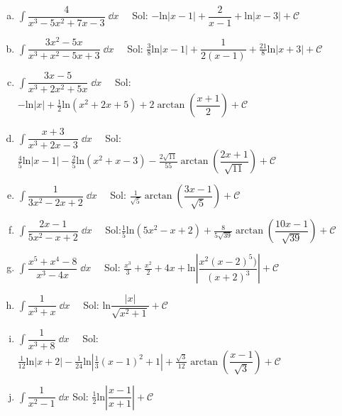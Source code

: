 {\begin{enumerate}[a) ]
\item $\displaystyle \int  \dfrac {4}{x^3-5x^2+7x-3} \; \dd x \quad $
\textcolor{gris}{Sol: $-\mathrm{ln}|x-1|+\dfrac {2}{x-1}+\mathrm{ln}|x-3|   +\mathcal C$}

\item $\displaystyle \int  \dfrac {3x^2-5x}{x^3+x^2-5x+3} \; \dd x \quad $
\textcolor{gris}{Sol: $\frac 3 8 \mathrm{ln} |x-1|+ \dfrac {1}{2(x-1)}+ \frac {21}{8} \mathrm{ln} |x+3|   +\mathcal C$}

\item $\displaystyle \int  \dfrac {3x-5}{x^3+2x^2+5x} \; \dd x \quad $
\textcolor{gris}{Sol: $ -\mathrm{ln}|x| + \frac 1 2 \mathrm{ln} (x^2+2x+5) + 2 \arctan \left( \dfrac {x+1}{2}  \right)  +\mathcal C$}

\item $\displaystyle \int  \dfrac {x+3}{x^3+2x-3} \; \dd x \quad $
\textcolor{gris}{Sol: $ \frac 4 5 \mathrm{ln} |x-1| - \frac 2 5 \mathrm{ln} (x^2+x-3) - \frac {2\sqrt{11}}{55} \arctan \left(\dfrac {2x+1}{\sqrt{11}} \right)  +\mathcal C$}

\item $\displaystyle \int  \dfrac {1}{3x^2-2x+2} \; \dd x \quad $
\textcolor{gris}{Sol: $ \frac {1}{\sqrt{5}} \arctan \left( \dfrac {3x-1}{\sqrt{5}}\right)  +\mathcal C$}

\item $\displaystyle \int  \dfrac {2x-1}{5x^2-x+2} \; \dd x \quad $
\textcolor{gris}{Sol:$\frac 1 5 \mathrm{ln} (5x^2-x+2)  + \frac {8} {5 \sqrt{39} } \arctan \left( \dfrac {10x-1}{\sqrt{39}} \right)  +\mathcal C$}

\item $\displaystyle \int  \dfrac {x^5+x^4-8}{x^3-4x} \; \dd x \quad $
\textcolor{gris}{Sol: $ \frac {x^3}{3}+ \frac {x^2}{2} + 4x + \mathrm{ln} \left| \dfrac {x^2 (x-2)^5)}{(x+2)^3} \right|  +\mathcal C$}

\item $\displaystyle \int  \dfrac {1}{x^3+x} \; \dd x \quad $
\textcolor{gris}{Sol: $ \mathrm {ln} \dfrac {|x|}{\sqrt{x^2+1}}  +\mathcal C$}

\item $\displaystyle \int  \dfrac {1}{x^3+8} \; \dd x \quad $
\textcolor{gris}{Sol: $ \frac {1}{12} \mathrm{ln} |x+2|-\frac {1}{24} \mathrm{ln} \left| \frac 1 3 (x-1)^2 + 1\right|  + \frac {\sqrt{3}}{12} \arctan \left( \dfrac {x-1}{\sqrt{3}}\right)+\mathcal C$}


\item $\displaystyle \int  \dfrac { 1 } { x^2-1 }    \; \dd x$
\textcolor{gris}{Sol: $\frac 1 2 \mathrm{ln} \left|\dfrac {x-1}{x+1} \right| +\mathcal C$ }


\end{enumerate}}
